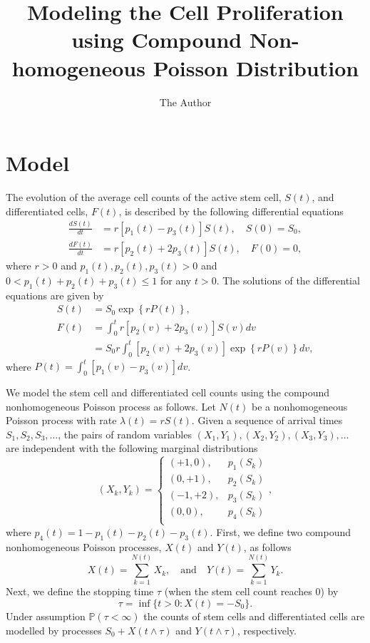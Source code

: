 \documentclass[10pt]{article}
\title{Modeling the Cell Proliferation using Compound Non-homogeneous Poisson Distribution}
\author{The Author}
\date{} %
\newcommand{\PP}{\mathbb{P}}
\begin{document}
\maketitle
\section{Model}
The evolution of the average cell counts of the active stem cell, $S(t)$, and differentiated cells, $F(t)$, is
described by the following differential equations
\begin{equation*}
\begin{split}
\frac{dS(t)}{dt} &= r[p_1(t) - p_3(t)] S(t), \quad S(0)=S_0, \\
\frac{dF(t)}{dt} &= r[p_2(t) + 2p_3(t)] S(t), \quad F(0)=0,
\end{split}
\end{equation*}
where $r>0$ and  $p_1(t), p_2(t), p_3(t)>0$ and  $0<p_1(t)+p_2(t)+p_3(t)\leq 1$ for any $t>0$. The solutions
of the differential equations are given by
\begin{equation*}
\begin{split}
S(t) & = S_0 \exp \left\{ r P(t) \right\}, \\
F(t) & = \int_0^t r  [p_2(v) + 2p_3(v)] S(v) dv\\
&= S_0  r   \int_0^t [p_2(v) + 2p_3(v)] \exp \left\{r P(v) \right\} dv,
\end{split}
\end{equation*}
where $P(t) = \int_0^t [p_1(v) - p_3(v)] dv$.

We model the stem cell and differentiated cell counts using the compound nonhomogeneous Poisson process as follows.
Let $N(t)$ be a nonhomogeneous Poisson process with rate $\lambda(t) = r S(t)$. Given a sequence of arrival times $S_1, S_2, S_3,\dots$, the pairs of random variables
$(X_1,Y_1), (X_2,Y_2), (X_3,Y_3), \dots$ are independent with the following marginal distributions
\begin{equation*}
(X_k, Y_k) = \begin{cases}
(+1,0),  & p_1(S_k) \\
(0,+1),  & p_2(S_k) \\
(-1,+2), & p_3(S_k) \\
(0,0),   & p_4(S_k)\\
\end{cases},
\end{equation*}
where $p_4(t)=1-p_1(t)-p_2(t)-p_3(t).$
First, we define two compound nonhomogeneous Poisson processes, $X(t)$ and $Y(t)$, as follows
\begin{equation*}
X(t) = \sum_{k=1}^{N(t)} X_{k}, \quad \text{and} \quad
Y(t) = \sum_{k=1}^{N(t)} Y_{k}.
\end{equation*}
Next, we define the stopping time $\tau$ (when the stem cell count reaches 0) by
\begin{equation*}
\tau=\inf\{t>0:X(t)=-S_0\}.
\end{equation*}
Under assumption $\PP(\tau<\infty)$ the counts of stem cells and differentiated cells are modelled by processes $S_0+X(t\wedge\tau)$ and $Y(t\wedge\tau)$, respectively.
\end{document}
